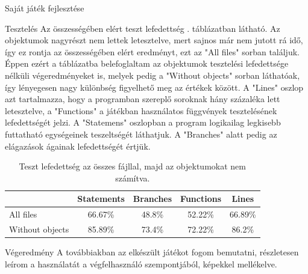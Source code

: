 \begin{MyChapter}{Saját játék fejlesztése}
\begin{MySection}{Tesztelés}
			Az összességében elért teszt lefedettség . táblázatban látható. Az objektumok nagyrészt nem lettek letesztelve, mert sajnos már nem jutott rá idő, így ez rontja az összességében elért eredményt, ezt az "All files" sorban találjuk. Éppen ezért a táblázatba belefoglaltam az objektumok tesztelési lefedettsége nélküli végeredményeket is, melyek pedig a "Without objects" sorban láthatóak, így lényegesen nagy különbség figyelhető meg az értékek között.
			A "Lines" oszlop azt tartalmazza, hogy a programban szereplő soroknak hány százaléka lett letesztelve, a "Functions" a játékban használatos függvények tesztelésének lefedettségét jelzi.
			A "Statemens" oszlopban a program logikailag legkisebb futtatható egységeinek teszeltségét láthatjuk.
			A "Branches" alatt pedig az elágazások ágainak lefedettségét értjük.
			
		\begin{table}[h]
			\centering
			\caption{Teszt lefedettség az összes fájllal, majd az objektumokat nem számítva.}
			\label{tab:teszt_lefedettseg}
			\begin{tabular}{l|c|c|c|c|}
				\cline{2-5}
				& Statements & Branches & Functions & Lines \\ \hline
				\multicolumn{1}{|l|}{All files} & 66.67\% & 48.8\% & 52.22\% & 66.89\% \\ \hline
				\multicolumn{1}{|l|}{Without objects} & 85.89\% & 73.4\% & 72.22\% & 86.2\% \\ \hline
			\end{tabular}
		\end{table}
		
	\end{MySection}

	\begin{MySection}{Végeredmény}
		A továbbiakban az elkészült játékot fogom bemutatni, részletesen leírom a használatát a végfelhasználó szempontjából, képekkel mellékelve.
		

\end{MySection}
\end{MyChapter}
